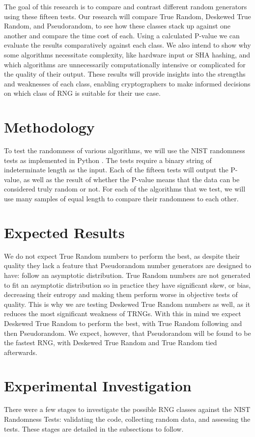 \documentclass[11pt,letterpaper,conference]{IEEEtran}
\begin{document}
The goal of this research is to compare and contrast different random generators using these fifteen tests.
Our research will compare True Random, Deskewed True Random, and Pseudorandom, to see how these classes
stack up against one another and compare the time cost of each. Using a calculated P-value we can evaluate
the results comparatively against each class. We also intend to show why some algorithms
necessitate complexity, like hardware input or SHA hashing, and which algorithms are unnecessarily
computationally intensive or complicated for the quality of their output. These results will provide
insights into the strengths and weaknesses of each class, enabling cryptographers to make informed decisions
on which class of RNG is suitable for their use case.

\section{Methodology}
To test the randomness of various algorithms, we will use the NIST randomness tests as
implemented in Python \cite{rtestsuite}. The tests require a binary string of indeterminate length as the input.
Each of the fifteen tests will output the P-value, as well as the result of whether the P-value means
that the data can be considered truly random or not. For each of the algorithms that we test, we
will use many samples of equal length to compare their randomness to each other.

\section{Expected Results}
We do not expect True Random numbers to perform the best, as despite their quality they lack a feature that
Pseudorandom number generators are designed to have: follow an asymptotic distribution. True Random numbers
are not generated to fit an asymptotic distribution so in practice they have significant skew, or bias, decreasing their
entropy and making them perform worse in objective tests of quality. This is why we are testing Deskewed True
Random numbers as well, as it reduces the most significant weakness of TRNGs. With this in mind we expect Deskewed True
Random to perform the best, with True Random following and then Pseudorandom. We expect, however, that Pseudorandom
will be found to be the fastest RNG, with Deskewed True Random and True Random tied afterwards.

\section{Experimental Investigation}
There were a few stages to investigate the possible RNG classes against the NIST Randomness Tests: validating the code, collecting random data, and assessing the tests. These stages are detailed in the subsections to follow.
\end{document}
